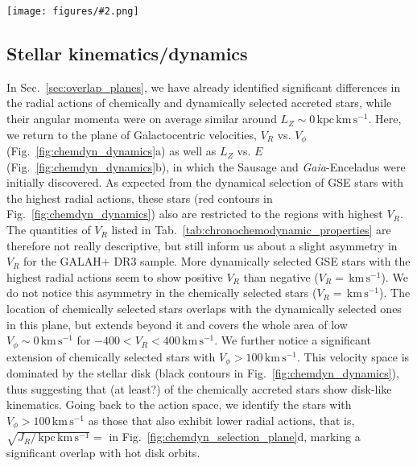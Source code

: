 \documentclass[fleqn,usenatbib]{mnras}
\newcommand{\kms}{\,\mathrm{km\,s^{-1}}}	%
\newcommand{\kpckms}{\,\mathrm{kpc\,km\,s^{-1}}}	%
\newcommand{\Gaia}{\textit{Gaia}\xspace} %
\newcommand{\codeicon}{{\faCloudDownload}}
\newcommand{\codelink}[1]{\href{https://github.com/svenbuder/buder_galah_accreted_chemistry/tree/main/figures/#1.ipynb}{\codeicon}\,\,}
\newcommand{\oscaption}[2]{\caption{#2 \codelink{#1}}}
\newcommand{\figuretextwidth}[4]{\begin{figure*} \centering \texttt{[image: figures/\#2.png]}\oscaption{#3}{#4}\label{fig:#2} \end{figure*}}
\begin{document}
\figuretextwidth{17cm}{chemdyn_dynamics}{chronochemodynamic_comparison}{
\textbf{Comparison of kinematic properties (Galactocentric velocities $V_R$ vs. $V_\phi$) as well as dynamic properties ($L_Z$, $E$, and $e$) for stars selected as accreted ones by means of chemistry (orange) and dynamics (red).} Black contours/lines denote the overall GALAH+ DR3 sample (mainly disk stars).
}

\subsection{Stellar kinematics/dynamics} \label{sec:gse_stellar_dynamics}

In Sec.~\ref{sec:overlap_planes}, we have already identified significant differences in the radial actions of chemically and dynamically selected accreted stars, while their angular momenta were on average similar around $L_Z \sim 0 \kpckms$. Here, we return to the plane of Galactocentric velocities, $V_R$ vs. $V_\phi$ (Fig.~\ref{fig:chemdyn_dynamics}a) as well as $L_Z$ vs. $E$ (Fig.~\ref{fig:chemdyn_dynamics}b), in which the Sausage \citep{Belokurov2018} and \Gaia-Enceladus \citep{Helmi2018} were initially discovered. As expected from the dynamical selection of GSE stars with the highest radial actions, these stars (red contours in Fig.~\ref{fig:chemdyn_dynamics}) also are restricted to the regions with highest $V_R$. The quantities of $V_R$ listed in Tab.~\ref{tab:chronochemodynamic_properties} are therefore not really descriptive, but still inform us about a slight asymmetry in $V_R$ for the GALAH+ DR3 sample. More dynamically selected GSE stars with the highest radial actions seem to show positive $V_R$ than negative ($V_R=$$\kms$). We do not notice this asymmetry in the chemically selected stars ($V_R=$$\kms$). The location of chemically selected stars overlaps with the dynamically selected ones in this plane, but extends beyond it and covers the whole area of low $V_\phi \sim 0 \kms$ for $-400 < V_R < 400\kms$. We further notice a significant extension of  chemically selected stars with $V_\phi > 100 \kms$. This velocity space is dominated by the stellar disk (black contours in Fig.~\ref{fig:chemdyn_dynamics}), thus suggesting that (at least?)  of the chemically accreted stars show disk-like kinematics. Going back to the action space, we identify the stars with $V_\phi > 100 \kms$ as those that also exhibit lower radial actions, that is, $\sqrt{J_R / \kpckms} = $ in Fig.~\ref{fig:chemdyn_selection_plane}d, marking a significant overlap with hot disk orbits.
\end{document}
